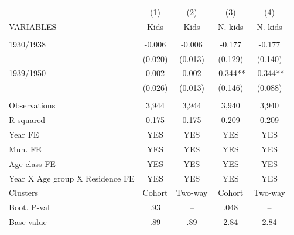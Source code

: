 \begin{tabular}{lcccc} \hline
 & (1) & (2) & (3) & (4) \\
VARIABLES & Kids & Kids & N. kids & N. kids \\ \hline
 &  &  &  &  \\
1930/1938 & -0.006 & -0.006 & -0.177 & -0.177 \\
 & (0.020) & (0.013) & (0.129) & (0.140) \\
1939/1950 & 0.002 & 0.002 & -0.344** & -0.344** \\
 & (0.026) & (0.013) & (0.146) & (0.088) \\
 &  &  &  &  \\
Observations & 3,944 & 3,944 & 3,940 & 3,940 \\
R-squared & 0.175 & 0.175 & 0.209 & 0.209 \\
Year FE & YES & YES & YES & YES \\
Mun. FE & YES & YES & YES & YES \\
Age class FE & YES & YES & YES & YES \\
Year X Age group X Residence FE & YES & YES & YES & YES \\
Clusters & Cohort & Two-way & Cohort & Two-way \\
Boot. P-val & .93 & -- & .048 & -- \\
 Base value & .89 & .89 & 2.84 & 2.84 \\ \hline
\end{tabular}
